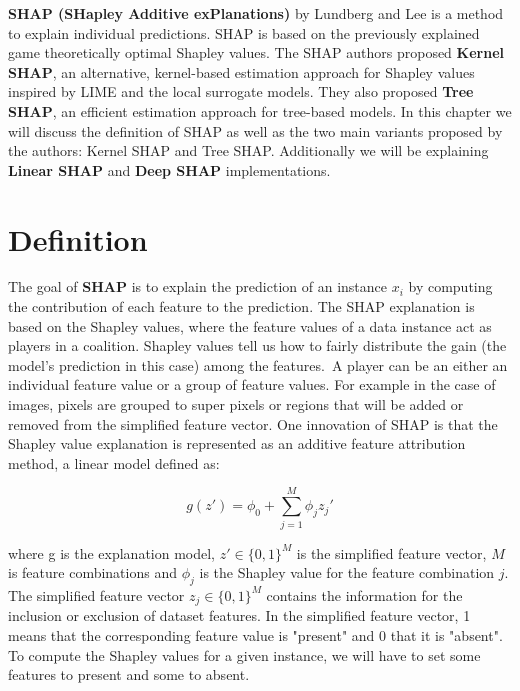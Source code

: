 \textbf{SHAP (SHapley Additive exPlanations)} by Lundberg and Lee \cite{Interpreting-Model-Predictions} is a method to explain individual predictions.
SHAP is based on the previously explained game theoretically optimal Shapley values. The SHAP authors proposed \textbf{Kernel SHAP}, an alternative, kernel-based estimation approach for Shapley values inspired by LIME and the local surrogate models. They also proposed \textbf{Tree SHAP}, an efficient estimation approach for tree-based models.
\newline
\newline
In this chapter we will discuss the definition of SHAP as well as the two main variants proposed by the authors: Kernel SHAP and Tree SHAP. Additionally we will be explaining \textbf{Linear SHAP} and \textbf{Deep SHAP} implementations.

\section{Definition}
\label{definition}

The goal of \textbf{SHAP} is to explain the prediction of an instance $x_i$ by computing the contribution of each feature to the prediction.
The SHAP explanation is based on the Shapley values, where the feature values of a data instance act as players in a coalition.
Shapley values tell us how to fairly distribute the gain (the model's prediction in this case) among the features.\
A player can be an either an individual feature value or a group of feature values.
For example in the case of images, pixels are grouped to super pixels or regions that will be added or removed from the simplified feature vector.
One innovation of SHAP is that the Shapley value explanation is represented as an additive feature attribution method, a linear model defined as:

$$g(z')=\phi_0+\sum_{j=1}^M\phi_jz_j'$$

where g is the explanation model, $z'\in\{0,1\}^M$ is the simplified feature vector, $M$ is feature combinations and $\phi_j$ is the Shapley value for the feature combination $j$.
\newline
\newline
The simplified feature vector $z_j\in\{0,1\}^M$ contains the information for the inclusion or exclusion of dataset features.
In the simplified feature vector, 1 means that the corresponding feature value is "present" and 0 that it is "absent".
To compute the Shapley values for a given instance, we will have to set some features to present and some to absent.

